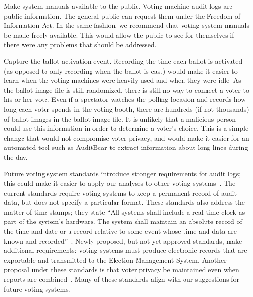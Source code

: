 \documentclass[letterpaper,twocolumn,10pt]{article}
\begin{document}
Make system manuals available to the public. Voting machine audit logs are
public information. The general public can request them under the Freedom of
Information Act. In the same fashion, we recommend that voting system manuals be
made freely available. This would allow the public to see for themselves if
there were any problems that should be addressed.  
 
Capture the ballot activation event. Recording the time each ballot is activated
(as opposed to only recording when the ballot is cast) would make it easier to
learn when the voting machines were heavily used and when they were idle. As the 
ballot image file is still randomized, there is still no way to connect a voter 
to his or her vote.  Even if a spectator watches the polling location and records 
how long each voter spends in the voting booth, there are hundreds (if not thousands) 
of ballot images in the ballot image file.  It is unlikely that a malicious person 
could use this information in order to determine a voter's choice.  This
is a simple change that would not compromise voter privacy, and would make it
easier for an automated tool such as AuditBear to extract information
about long lines during the day.

Future voting system standards introduce stronger
requirements for audit logs; this could make it easier to apply our analyses to
other voting systems~\cite{Wagner2010}. The current standards require voting systems 
to keep a permanent record of audit data, but does not specify a particular format. 
These standards also address the matter of time stamps; they state 
``All systems shall include a real-time clock as part of the system’s hardware.
The system shall maintain an absolute record of the time and date or a record
relative to some event whose time and data are known and recorded''~\cite{CurrentStandards}. Newly proposed, 
but not yet approved standards, make additional requirements: voting systems must 
produce electronic records that are exportable and transmitted to the Election Management 
System.  Another proposal under these standards is that voter privacy be maintained 
even when reports are combined~\cite{ProposedStandards}.  Many of these standards align with our suggestions for 
future voting systems. 
 
\end{document}
